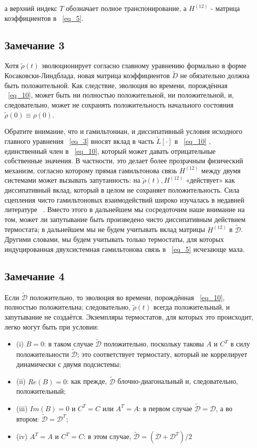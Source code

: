 \documentclass[11pt]{article}
\begin{document}
а верхний индекс $T$ обозначает полное транспонирование, а $H^{(12)}$ - матрица коэффициентов в ~\ref{eq_5}.

\subsection{Замечание 3}
Хотя $\tilde \rho (t)$ эволюционирует согласно главному уравнению формально в форме Косаковски-Линдблада, новая матрица коэффициентов $\tilde{D}$ не обязательно должна быть положительной.
Как следствие, эволюция во времени, порождённая ~\ref{eq_10}, может быть ни полностью положительной, ни положительной, и, следовательно, может не сохранять положительность начального состояния $\tilde{\rho}(0) \equiv \rho(0)$.

Обратите внимание, что и гамильтониан, и диссипативный
условия исходного главного уравнения ~\ref{eq_3} вносят вклад в часть $\tilde{L}[\cdot]$ в ~\ref{eq_10} , единственный член в ~\ref{eq_10}, который может давать отрицательные собственные значения. В частности, это делает более прозрачным физический механизм, согласно которому прямая гамильтонова связь $H^{(12)}$ между двумя системами может вызывать запутанность: на $\tilde{\rho}(t),H^{(12)}$ «действует» как диссипативный вклад, который в целом не сохраняет положительность. Сила сцепления чисто гамильтоновых взаимодействий широко изучалась в недавней литературе ~\cite{b1,b2,b3,b4,b5}. Вместо этого в дальнейшем мы сосредоточим наше внимание на том, может ли запутывание быть произведено чисто диссипативным действием термостата; в дальнейшем мы не будем учитывать вклад матрицы $H^{(12)}$ в $\tilde{\mathscr{D}}$. Другими словами, мы будем учитывать только термостаты, для которых индуцированная двухсистемная гамильтонова связь в ~\ref{eq_5} исчезающе мала.

\subsection{Замечание 4}
Если $\tilde{\mathscr{D}}$ положительно, то эволюция во времени, порождённая ~\ref{eq_10}, полностью положительна; следовательно, $\tilde{\rho}(t)$ всегда положительный, и запутывание не создаётся. Экземпляры термостатов, для которых это происходит, легко могут быть
при условии:

\begin{itemize} 
	\item (i) $B=0$: в таком случае $\tilde{\mathscr{D}}$ положительно, поскольку таковы $A$ и $C^T$ в силу положительности $\tilde{\mathscr{D}}$; это соответствует термостату,  который не коррелирует динамически с двумя подсистемы;
	\item (ii) $Re(B)=0$: как прежде, $\tilde{\mathscr{D}}$ блочно-диагональный и, следовательно, положительный;
	\item (iii) $Im(B)=0$ и $C^T=C$ или $A^T=A$: в первом случае $\tilde{\mathscr{D}} = \mathscr{D}$, а во втором: $\tilde{\mathscr{D}} = \mathscr{D}^T $;
	\item (iv) $A^T=A$ и $C^T=C$: в этом случае, $\tilde{\mathscr{D}} = (\mathscr{D} + \mathscr{D}^T)/2 $
\end{itemize} 
\end{document}
